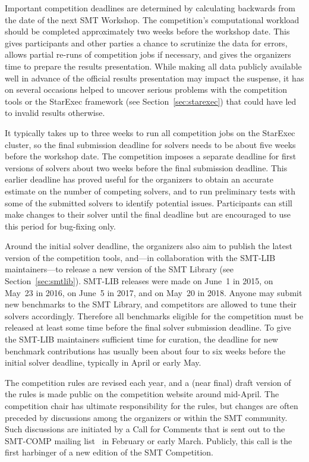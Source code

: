 \documentclass[dvipsnames,table,twoside,11pt]{article}
\begin{document}
Important competition deadlines are determined by calculating
backwards from the date of the next SMT Workshop.  The competition's
computational workload should be completed approximately two weeks
before the workshop date.  This gives participants and other parties a
chance to scrutinize the data for errors, allows partial re-runs of
competition jobs if necessary, and gives the organizers time to
prepare the results presentation.  While making all data publicly
available well in advance of the official results presentation may
impact the suspense, it has on several occasions helped to uncover
serious problems with the competition tools or the StarExec framework
(see Section~\ref{sec:starexec}) that could have led to invalid
results otherwise.

It typically takes up to three weeks to run all competition jobs on
the StarExec cluster, so the final submission deadline for solvers
needs to be about five weeks before the workshop date.  The
competition imposes a separate deadline for first versions of solvers
about two weeks before the final submission deadline.  This earlier
deadline has proved useful for the organizers to obtain an accurate
estimate on the number of competing solvers, and to run preliminary
tests with some of the submitted solvers to identify potential issues.
Participants can still make changes to their solver until the final
deadline but are encouraged to use this period for bug-fixing only.

Around the initial solver deadline, the organizers also aim to publish
the latest version of the competition tools, and---in collaboration
with the SMT-LIB maintainers---to release a new version of the SMT
Library (see Section~\ref{sec:smtlib}).  SMT-LIB releases were made on
June~1 in 2015, on May~23 in 2016, on June~5 in 2017, and on May~20 in
2018.  Anyone may submit new benchmarks to the SMT Library, and
competitors are allowed to tune their solvers accordingly.
Therefore all benchmarks eligible for the competition must be released
at least some time before the final solver submission deadline.  To
give the SMT-LIB maintainers sufficient time for curation, the
deadline for new benchmark contributions has usually been about four
to six weeks before the initial solver deadline, typically in April or
early May.

The competition rules are revised each year, and a (near final) draft
version of the rules is made public on the competition website around
mid-April.  The competition chair has ultimate responsibility for the
rules, but changes are often preceded by discussions among the
organizers or within the SMT community.  Such discussions are
initiated by a Call for Comments that is sent out to the SMT-COMP
mailing list~\cite{smtcomp-mailinglist} in February or early March.
Publicly, this call is the first harbinger of a new edition of the SMT
Competition.
\end{document}
